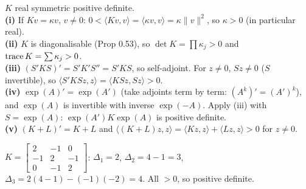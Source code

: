 \begin{workbox}[title={Worked example (AE3, A3.4): all five parts}]
$K$ real symmetric positive definite.\\
\textbf{(i)} If $Kv=\kappa v$, $v\neq0$: $0<\langle Kv,v\rangle=\langle\kappa v,v\rangle=\kappa\|v\|^2$, so $\kappa>0$ (in particular real).\\
\textbf{(ii)} $K$ is diagonalisable (Prop 0.53), so $\det K=\prod\kappa_j>0$ and $\operatorname{trace} K=\sum\kappa_j>0$.\\
\textbf{(iii)} $(S'KS)'=S'K'S''=S'KS$, so self-adjoint. For $z\neq0$, $Sz\neq0$ ($S$ invertible), so $\langle S'KSz,z\rangle=\langle KSz,Sz\rangle>0$.\\
\textbf{(iv)} $\exp(A)'=\exp(A')$ (take adjoints term by term: $(A^k)'=(A')^k$), and $\exp(A)$ is invertible with inverse $\exp(-A)$. Apply (iii) with $S=\exp(A)$: $\exp(A')K\exp(A)$ is positive definite.\\
\textbf{(v)} $(K+L)'=K+L$ and $\langle(K+L)z,z\rangle=\langle Kz,z\rangle+\langle Lz,z\rangle>0$ for $z\neq0$.
\end{workbox}
\begin{workbox}[title={Worked example: leading principal minors}]
$K=\begin{bmatrix}2&-1&0\\-1&2&-1\\0&-1&2\end{bmatrix}$: $\Delta_1=2$, $\Delta_2=4-1=3$, $\Delta_3=2(4-1)-(-1)(-2)=4$. All $>0$, so positive definite.
\end{workbox}

